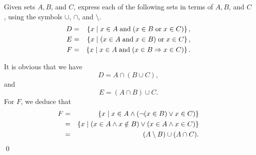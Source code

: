 \documentclass[a4paper,12pt]{article}
\begin{document}
\begin{exe}
	Given sets \( A,B \), and \( C \), express each of the following sets in terms of
	\( A, B \), and \( C \), using the symbols \( \cup \), \(\cap \), and \( \setminus \).
	\begin{eqnarray*}
		D &=&
		\left\{ x \;|\; x\in A\;\text{and}\;( x \in B \;\text{or}\; x \in C) \right\},\\
		E &=&
		\left\{ x \;|\; (x \in A\;\text{and}\; x \in B) \;\text{or}\; x \in C \right\},\\
		F &=&
		\left\{ x \;|\; x\in A\;\text{and}\;( x \in B \Rightarrow x \in C) \right\}.
	\end{eqnarray*}
\end{exe}\begin{sol}%
	It is obvious that we have
	\begin{equation*}
		D=A \cap (B \cup C),
	\end{equation*}
	and
	\begin{equation*}
		E=(A\cap B)\cup C.
	\end{equation*}
	For \( F \), we deduce that
	\begin{eqnarray*}
		F
		&=&
		\left\{ x \;|\; x\in A \wedge(\neg(x\in B) \vee x\in C) \right\}\\
		&=&
		\left\{ x \;|\; (x\in A \wedge x\notin B)
		\vee
		(x \in A \wedge x\in C)
		\right\}\\
		&=&
		(A\setminus B)\cup (A\cap C).
	\end{eqnarray*}
	\qed\end{sol}
\end{document}
